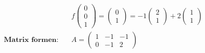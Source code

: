 \documentclass[11pt]{article}
\begin{document}
\begin{equation*}
\begin{split}
	& f\begin{pmatrix}
		0 \\ 0 \\ 1
	\end{pmatrix} = \begin{pmatrix}
		0 \\ 1
	\end{pmatrix} = -1\begin{pmatrix}
		2 \\ 1
	\end{pmatrix} + 2\begin{pmatrix}
		1 \\ 1
	\end{pmatrix} \\
	\textbf{Matrix formen:} \quad & A = \begin{pmatrix}
		1 & -1 & -1 \\ 0 & -1 & 2
	\end{pmatrix}
\end{split}
\end{equation*}
\end{document}
